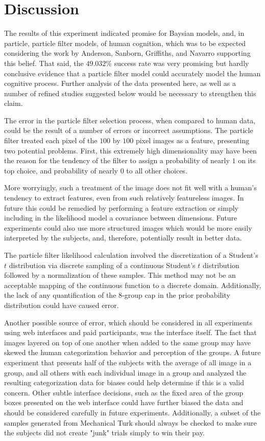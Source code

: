 \section{Discussion}
\label{sec:discussion}

The results of this experiment indicated promise for Baysian models, and, in particle, particle
filter models, of human cognition, which was to be expected considering the work
by Anderson, Sanborn, Griffiths, and Navarro supporting this belief. That said,
the $49.032\%$ success rate was very promising but hardly conclusive evidence
that a particle filter model could accurately model the human cognitive process.
Further analysis of the data presented here, as well as a number of refined
studies suggested below would be necessary to strengthen this claim.

The error in the particle filter selection process, when compared to human data,
could be the result of a number of errors or incorrect assumptions. The particle
filter treated each pixel of the $100$ by $100$ pixel images as a feature, presenting
two potential problems. First, this extremely high dimensionality may have been
the reason for the tendency of the filter to assign a probability of nearly $1$
on its top choice, and probability of nearly $0$ to all other choices.

More worryingly, such a treatment of the image does not fit well with a human's
tendency to extract features, even from such relatively featureless images. In
future this could be remedied by performing a feature extraction or simply
including in the likelihood model a covariance between dimensions. Future
experiments could also use more structured images which would be more easily
interpreted by the subjects, and, therefore, potentially result in better data.

The particle filter likelihood calculation involved the discretization of a
Student's $t$ distribution via discrete sampling of a continuous Student's $t$
distribution followed by a normalization of these samples. This method may not
be an acceptable mapping of the continuous function to a discrete domain.
Additionally, the lack of any quantification of the 8-group cap in the prior
probability distribution could have caused error.

Another possible source of error, which should be considered in all experiments
using web interfaces and paid participants, was the interface itself. The fact
that images layered on top of one another when added to the same group may have
skewed the human categorization behavior and perception of the groups. A future
experiment that presents half of the subjects with the average of all image in a group,
and all others with each individual image in a group and analyzed the resulting
categorization data for biases could help determine if this is a valid concern.
Other subtle interface decisions, such as the fixed area of the group boxes presented
on the web interface could have further biased the data and should be considered
carefully in future experiments. Additionally, a subset of the samples generated
from Mechanical Turk should always be checked to make sure the subjects did not
create "junk" trials simply to win their pay.

